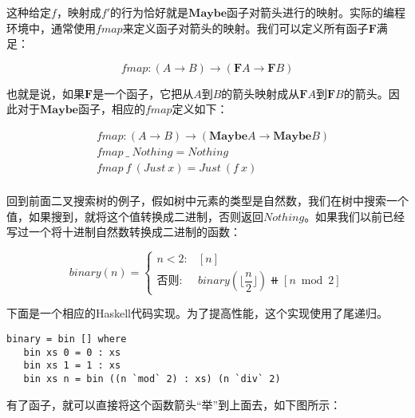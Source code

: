 \documentclass{article}
\begin{document}
\begin{example}
这种给定$f$，映射成$f'$的行为恰好就是$\mathbf{Maybe}$函子对箭头进行的映射。实际的编程环境中，通常使用$fmap$来定义函子对箭头的映射。我们可以定义所有函子$\mathbf{F}$满足：

\[
fmap : (A \to B) \to (\mathbf{F} A \to \mathbf{F} B)
\]

也就是说，如果$\mathbf{F}$是一个函子，它把从$A$到$B$的箭头映射成从$\mathbf{F} A$到$\mathbf{F} B$的箭头。因此对于$\mathbf{Maybe}$函子，相应的$fmap$定义如下：

\[
\begin{array}{l}
\quad    fmap : (A \to B) \to (\mathbf{Maybe} A \to \mathbf{Maybe} B) \\
\quad    fmap\ \_\ Nothing = Nothing \\
\quad    fmap\ f\ (Just\ x) = Just\ (f\ x) \\
\end{array}
\]

回到前面二叉搜索树的例子，假如树中元素的类型是自然数，我们在树中搜索一个值，如果搜到，就将这个值转换成二进制，否则返回$Nothing$。如果我们以前已经写过一个将十进制自然数转换成二进制的函数：

\[
binary(n) = \begin{cases}
n < 2: & [n] \\
\text{否则}: & binary(\lfloor\dfrac{n}{2}\rfloor)\doubleplus[n \bmod 2]
\end{cases}
\]

下面是一个相应的Haskell代码实现。为了提高性能，这个实现使用了尾递归。

\lstset{frame=single}
\begin{lstlisting}[style=Haskell]
binary = bin [] where
   bin xs 0 = 0 : xs
   bin xs 1 = 1 : xs
   bin xs n = bin ((n `mod` 2) : xs) (n `div` 2)
\end{lstlisting}

有了函子，就可以直接将这个函数箭头“举”到上面去，如下图所示：

\begin{center}
\end{center}


\end{example}
\end{document}
